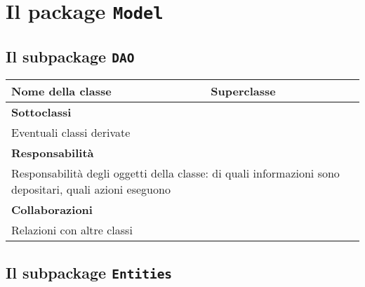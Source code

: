 \section{Il package \texttt{Model}}
\subsection{Il subpackage \texttt{DAO}}
\begin{table}[h!]
\begin{tabular}{|l|l|}
\hline
\textbf{Nome della classe} & \textbf{Superclasse} \\ \hline
\multicolumn{2}{|l|}{\textbf{Sottoclassi}}\\
\multicolumn{2}{|l|}{Eventuali classi derivate} \\ \hline
\multicolumn{2}{|l|}{\textbf{Responsabilità}}\\
\multicolumn{2}{|l|}{Responsabilità degli oggetti della classe: di quali informazioni sono depositari, quali azioni eseguono} \\ \hline
\multicolumn{2}{|l|}{\textbf{Collaborazioni}}\\
\multicolumn{2}{|l|}{Relazioni con altre classi} \\ \hline
\end{tabular}
\end{table}
\subsection{Il subpackage \texttt{Entities}}